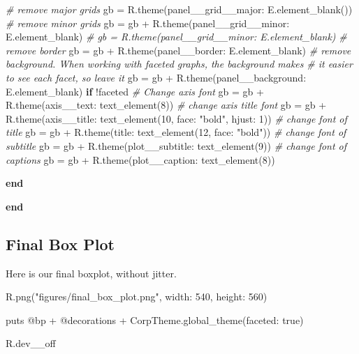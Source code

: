 \documentclass[11pt,]{article}
\newenvironment{Shaded}{\begin{snugshade}}{\end{snugshade}}
\newcommand{\KeywordTok}[1]{\textcolor[rgb]{0.13,0.29,0.53}{\textbf{#1}}}
\newcommand{\DataTypeTok}[1]{\textcolor[rgb]{0.13,0.29,0.53}{#1}}
\newcommand{\DecValTok}[1]{\textcolor[rgb]{0.00,0.00,0.81}{#1}}
\newcommand{\StringTok}[1]{\textcolor[rgb]{0.31,0.60,0.02}{#1}}
\newcommand{\CommentTok}[1]{\textcolor[rgb]{0.56,0.35,0.01}{\textit{#1}}}
\newcommand{\OtherTok}[1]{\textcolor[rgb]{0.56,0.35,0.01}{#1}}
\newcommand{\NormalTok}[1]{#1}
\begin{document}
\begin{Shaded}
\begin{Highlighting}[]
    \CommentTok{# remove major grids}
\NormalTok{    gb = R.theme(}\StringTok{panel__grid__major: }\NormalTok{E.element_blank())}
    \CommentTok{# remove minor grids}
\NormalTok{    gb = gb + R.theme(}\StringTok{panel__grid__minor: }\NormalTok{E.element_blank)}
    \CommentTok{# gb = R.theme(panel__grid__minor: E.element_blank)}
    \CommentTok{# remove border}
\NormalTok{    gb = gb + R.theme(}\StringTok{panel__border: }\NormalTok{E.element_blank)}
    \CommentTok{# remove background. When working with faceted graphs, the background makes}
    \CommentTok{# it easier to see each facet, so leave it}
\NormalTok{    gb = gb + R.theme(}\StringTok{panel__background: }\NormalTok{E.element_blank) }\KeywordTok{if}\NormalTok{ !faceted}
    \CommentTok{# Change axis font}
\NormalTok{    gb = gb + R.theme(}\StringTok{axis__text: }\NormalTok{text_element(}\DecValTok{8}\NormalTok{))}
    \CommentTok{# change axis title font}
\NormalTok{    gb = gb + R.theme(}\StringTok{axis__title: }\NormalTok{text_element(}\DecValTok{10}\NormalTok{, }\StringTok{face: "bold"}\NormalTok{, }\StringTok{hjust: }\DecValTok{1}\NormalTok{))}
    \CommentTok{# change font of title}
\NormalTok{    gb = gb + R.theme(}\StringTok{title: }\NormalTok{text_element(}\DecValTok{12}\NormalTok{, }\StringTok{face: "bold"}\NormalTok{))}
    \CommentTok{# change font of subtitle}
\NormalTok{    gb = gb + R.theme(}\StringTok{plot__subtitle: }\NormalTok{text_element(}\DecValTok{9}\NormalTok{))}
    \CommentTok{# change font of captions}
\NormalTok{    gb = gb + R.theme(}\StringTok{plot__caption: }\NormalTok{text_element(}\DecValTok{8}\NormalTok{))}

  \KeywordTok{end}
   
\KeywordTok{end}
\end{Highlighting}
\end{Shaded}

\subsection{Final Box Plot}\label{final-box-plot}

Here is our final boxplot, without jitter.

\begin{Shaded}
\begin{Highlighting}[]
\NormalTok{R.png(}\StringTok{"figures/final_box_plot.png"}\NormalTok{, }\StringTok{width: }\DecValTok{540}\NormalTok{, }\StringTok{height: }\DecValTok{560}\NormalTok{)}

\NormalTok{puts }\OtherTok{@bp}\NormalTok{ + }\OtherTok{@decorations}\NormalTok{ + }\DataTypeTok{CorpTheme}\NormalTok{.global_theme(}\StringTok{faceted: }\DecValTok{true}\NormalTok{)}

\NormalTok{R.dev__off}
\end{Highlighting}
\end{Shaded}
\end{document}

